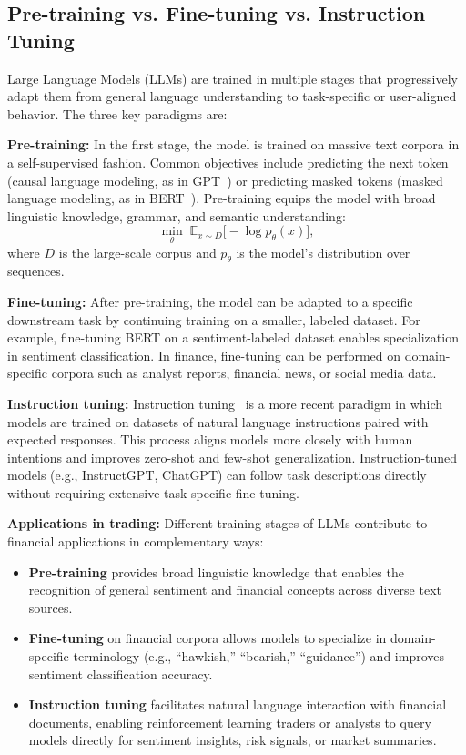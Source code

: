 \documentclass[12pt,a4paper]{report}
\begin{document}
\subsection{Pre-training vs. Fine-tuning vs. Instruction Tuning}

Large Language Models (LLMs) are trained in multiple stages that progressively adapt them from general language understanding to task-specific or user-aligned behavior. The three key paradigms are:

\bigskip
\textbf{Pre-training:}  
In the first stage, the model is trained on massive text corpora in a self-supervised fashion. Common objectives include predicting the next token (causal language modeling, as in GPT~\cite{radford2019language}) or predicting masked tokens (masked language modeling, as in BERT~\cite{devlin2019bert}). Pre-training equips the model with broad linguistic knowledge, grammar, and semantic understanding:
\[
\min_\theta \; \mathbb{E}_{x \sim D} \Big[ - \log p_\theta(x) \Big],
\]
where $D$ is the large-scale corpus and $p_\theta$ is the model’s distribution over sequences.

\bigskip
\textbf{Fine-tuning:}  
After pre-training, the model can be adapted to a specific downstream task by continuing training on a smaller, labeled dataset. For example, fine-tuning BERT on a sentiment-labeled dataset enables specialization in sentiment classification. In finance, fine-tuning can be performed on domain-specific corpora such as analyst reports, financial news, or social media data.

\bigskip
\textbf{Instruction tuning:}  
Instruction tuning~\cite{ouyang2022training} is a more recent paradigm in which models are trained on datasets of natural language instructions paired with expected responses. This process aligns models more closely with human intentions and improves zero-shot and few-shot generalization. Instruction-tuned models (e.g., InstructGPT, ChatGPT) can follow task descriptions directly without requiring extensive task-specific fine-tuning.

\bigskip
\textbf{Applications in trading:}  
Different training stages of LLMs contribute to financial applications in complementary ways:
\begin{itemize}
    \item \textbf{Pre-training} provides broad linguistic knowledge that enables the recognition of general sentiment and financial concepts across diverse text sources.
    \item \textbf{Fine-tuning} on financial corpora allows models to specialize in domain-specific terminology (e.g., “hawkish,” “bearish,” “guidance”) and improves sentiment classification accuracy.
    \item \textbf{Instruction tuning} facilitates natural language interaction with financial documents, enabling reinforcement learning traders or analysts to query models directly for sentiment insights, risk signals, or market summaries.
\end{itemize}
\end{document}

